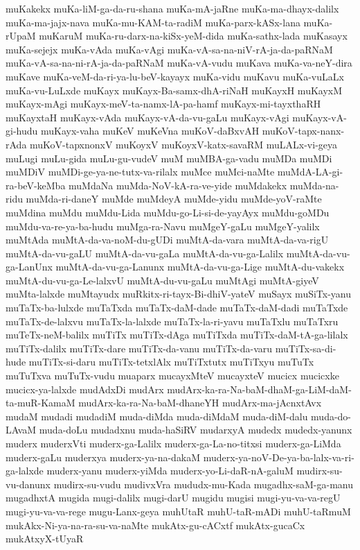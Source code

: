 {muKakekx
muKa-liM-ga-da-ru-shana
muKa-mA-jaRne
muKa-ma-dhayx-dalilx
muKa-ma-jajx-nava
muKa-mu-KAM-ta-radiM
muKa-parx-kASx-lana
muKa-rUpaM
muKaruM
muKa-ru-darx-na-kiSx-yeM-dida
muKa-sathx-lada
muKasayx
muKa-sejejx
muKa-vAda
muKa-vAgi
muKa-vA-sa-na-niV-rA-ja-da-paRNaM
muKa-vA-sa-na-ni-rA-ja-da-paRNaM
muKa-vA-vudu
muKava
muKa-va-neY-dira
muKave
muKa-veM-da-ri-ya-lu-beV-kayayx
muKa-vidu
muKavu
muKa-vuLaLx
muKa-vu-LuLxde
muKayx
muKayx-Ba-samx-dhA-riNaH
muKayxH
muKayxM
muKayx-mAgi
muKayx-meV-ta-namx-lA-pa-hamf
muKayx-mi-tayxthaRH
muKayxtaH
muKayx-vAda
muKayx-vA-da-vu-gaLu
muKayx-vAgi
muKayx-vA-gi-hudu
muKayx-vaha
muKeV
muKeVna
muKoV-daBxvAH
muKoV-tapx-nanx-rAda
muKoV-tapxnonxV
muKoyxV
muKoyxV-katx-savaRM
muLALx-vi-geya
muLugi
muLu-gida
muLu-gu-vudeV
muM
muMBA-ga-vadu
muMDa
muMDi
muMDiV
muMDi-ge-ya-ne-tutx-va-rilalx
muMce
muMci-naMte
muMdA-LA-gi-ra-beV-keMba
muMdaNa
muMda-NoV-kA-ra-ve-yide
muMdakekx
muMda-na-ridu
muMda-ri-daneY
muMde
muMdeyA
muMde-yidu
muMde-yoV-raMte
muMdina
muMdu
muMdu-Lida
muMdu-go-Li-si-de-yayAyx
muMdu-goMDu
muMdu-va-re-ya-ba-hudu
muMga-ra-Navu
muMgeY-gaLu
muMgeY-yalilx
muMtAda
muMtA-da-va-noM-du-gUDi
muMtA-da-vara
muMtA-da-va-rigU
muMtA-da-vu-gaLU
muMtA-da-vu-gaLa
muMtA-da-vu-ga-Lalilx
muMtA-da-vu-ga-LanUnx
muMtA-da-vu-ga-Lanunx
muMtA-da-vu-ga-Lige
muMtA-du-vakekx
muMtA-du-vu-ga-Le-lalxvU
muMtA-du-vu-gaLu
muMtAgi
muMtA-giyeV
muMta-lalxde
muMtayudx
muRkitx-ri-tayx-Bi-dhiV-yateV
muSayx
muSiTx-yanu
muTaTx-ba-lulxde
muTaTxda
muTaTx-daM-dade
muTaTx-daM-dadi
muTaTxde
muTaTx-de-lalxvu
muTaTx-la-lalxde
muTaTx-la-ri-yavu
muTaTxlu
muTaTxru
muTeTx-neM-balilx
muTiTx
muTiTx-dAga
muTiTxda
muTiTx-daM-tA-ga-lilalx
muTiTx-dalilx
muTiTx-dare
muTiTx-da-vanu
muTiTx-da-varu
muTiTx-sa-di-hude
muTiTx-si-daru
muTiTx-tetxlAlx
muTiTxtutx
muTiTxyu
muTuTx
muTuTxva
muTuTx-vudu
muaparx
mucayxMteV
mucayxteV
mucicx
mucicxke
mucicx-ya-lalxde
mudAdxDi
mudArx
mudArx-ka-ra-Na-baM-dhaM-ga-LiM-daM-ta-muR-KamaM
mudArx-ka-ra-Na-baM-dhaneYH
mudArx-ma-jAcnxtAvx
mudaM
mudadi
mudadiM
muda-diMda
muda-diMdaM
muda-diM-dalu
muda-do-LAvaM
muda-doLu
mudadxnu
muda-haSiRV
mudarxyA
mudedx
mudedx-yanunx
muderx
muderxVti
muderx-ga-Lalilx
muderx-ga-La-no-titxsi
muderx-ga-LiMda
muderx-gaLu
muderxya
muderx-ya-na-dakaM
muderx-ya-noV-De-ya-ba-lalx-va-ri-ga-lalxde
muderx-yanu
muderx-yiMda
muderx-yo-Li-daR-nA-galuM
mudirx-su-vu-danunx
mudirx-su-vudu
mudivxVra
mududx-mu-Kada
mugadhx-saM-ga-manu
mugadhxtA
mugida
mugi-dalilx
mugi-darU
mugidu
mugisi
mugi-yu-va-va-regU
mugi-yu-va-va-rege
mugu-Lanx-geya
muhUtaR
muhU-taR-mADi
muhU-taRmuM
mukAkx-Ni-ya-na-ra-su-va-naMte
mukAtx-gu-cACxtf
mukAtx-gucaCx
mukAtxyX-tUyaR
}
